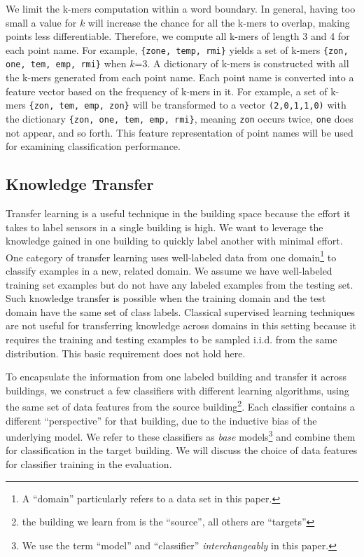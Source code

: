 We limit the k-mers computation within a word boundary.
In general, having too small a value for $k$ will increase the chance for all the k-mers to overlap, making points less differentiable.
Therefore, we compute all k-mers of length 3 and 4 for each point name.
For example, \texttt{\{zone, temp, rmi\}} yields a set of k-mers \texttt{\{zon, one, tem, emp, rmi\}} when $k$=3.
A dictionary of k-mers is constructed with all the k-mers generated from each point name. 
Each point name is converted into a feature vector based on the frequency of k-mers in it. 
For example, a set of k-mers \texttt{\{zon, tem, emp, zon\}} will be transformed to a vector
\texttt{(2,0,1,1,0)} with the dictionary \texttt{\{zon, one, tem, emp, rmi\}}, meaning \texttt{zon} occurs twice, \texttt{one} does 
not appear, and so forth. 
This feature representation of point names will be used for examining classification performance.


\subsection{Knowledge Transfer}
Transfer learning is a useful technique in the building space because the effort it takes to label sensors in a single building is high.  
We want to leverage the knowledge gained in one building to quickly label another with minimal effort.  
One category of transfer learning uses well-labeled data from one domain\footnote{A ``domain'' particularly refers to a data set in this paper.}  
to classify examples in a new, related domain.
We assume we have well-labeled training set examples but do not have any labeled examples from the testing set. 
Such knowledge transfer is possible when the training domain and the test domain have the same set of class labels. 
Classical supervised learning techniques are not useful for transferring knowledge across domains in this setting because 
it requires the training and testing examples to be sampled i.i.d. from the same distribution. This basic requirement does not hold here.

To encapsulate the information from one labeled building and transfer it across buildings, we construct a few classifiers with different 
learning algorithms, using the same set of data features from the source building\footnote{the building we learn from is the ``source'', all others are ``targets''}.   
Each classifier contains a different ``perspective'' for that building, due to the inductive bias of the underlying model. 
We refer to these classifiers as {\it base} models\footnote{We use the term ``model'' and ``classifier'' {\it interchangeably} in this paper.} and combine them for 
classification in the target building.
We will discuss the choice of data features for classifier training in the evaluation.


